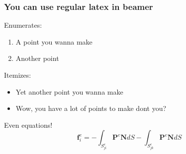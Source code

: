 \begin{frame}
    \frametitle{You can use regular latex in beamer}
    \pause
    Enumerates:
    \begin{enumerate}
        \item A point you wanna make
        \item Another point
    \end{enumerate}
    \pause
    Itemizes:
    \begin{itemize}
        \item Yet another point you wanna make
        \item Wow, you have a lot of points to make dont you?
    \end{itemize}
    \pause
    Even equations!
    \begin{equation}
        \mathbf{f}^e_i = - \int_{S^e_{ji}} \mathbf{P}^e\mathbf{N}dS -
                  \int_{S^e_{jk}} \mathbf{P}^e\mathbf{N}dS
    \end{equation}
\end{frame}

